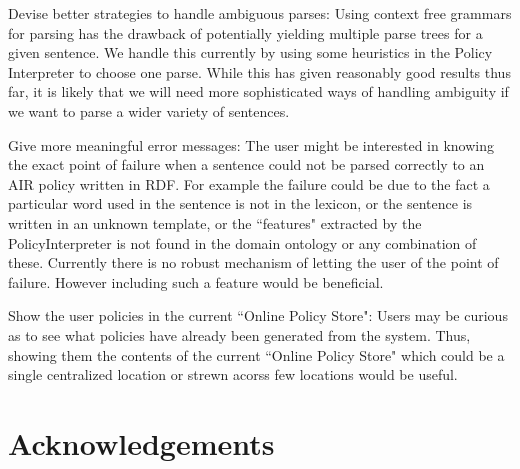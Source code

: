 \documentclass{llncs}
\begin{document}
Devise better strategies to handle ambiguous parses: Using context free grammars for parsing has the drawback of potentially yielding multiple parse trees for a given sentence. We handle this currently by using some heuristics in the Policy Interpreter to choose one parse. While this has given reasonably good results thus far, it is likely that we will need more sophisticated ways of handling ambiguity if we want to parse a wider variety of sentences.

Give more meaningful error messages: The user might be interested in knowing the exact point of failure when a sentence could not be parsed correctly to an AIR policy written in RDF. For example the failure could be due to the fact a particular word used in the sentence is not in the lexicon, or the sentence is written in an unknown template, or the ``features" extracted by the PolicyInterpreter is not found in the domain ontology or any combination of these. Currently there is no robust mechanism of letting the user of the point of failure. However including such a feature would be beneficial.

Show the user policies in the current ``Online Policy Store": Users may be curious as to see what policies have already been generated from the system. Thus, showing them the contents of the current ``Online Policy Store" which could be a single centralized location or strewn acorss few locations would be useful.



\section*{Acknowledgements}




\end{document}
